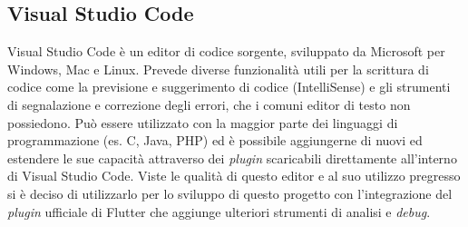 \subsection{Visual Studio Code}
Visual Studio Code è un editor di codice sorgente, sviluppato da Microsoft per Windows, Mac e Linux. Prevede diverse funzionalità utili per la scrittura di codice come la previsione e suggerimento di codice (IntelliSense) e gli strumenti di segnalazione e correzione degli errori, che i comuni editor di testo non possiedono.
Può essere utilizzato con la maggior parte dei linguaggi di programmazione (es. C, Java, PHP) ed è possibile aggiungerne di nuovi ed estendere le sue capacità attraverso dei \textit{plugin} scaricabili direttamente all'interno di Visual Studio Code.
Viste le qualità di questo editor e al suo utilizzo pregresso si è deciso di utilizzarlo per lo sviluppo di questo progetto con l'integrazione del \textit{plugin} ufficiale di Flutter che aggiunge ulteriori strumenti di analisi e \textit{debug}.